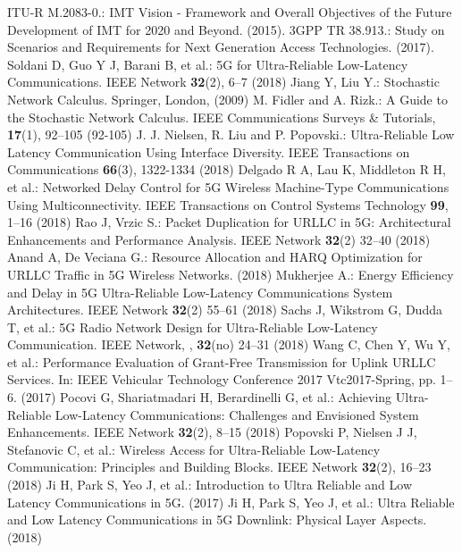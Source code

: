 \documentclass[runningheads]{llncs}
\begin{document}
\begin{thebibliography}{8}
ITU-R M.2083-0.: IMT Vision - Framework and Overall Objectives of the Future Development of IMT for 2020 and Beyond. (2015).
 3GPP TR 38.913.: Study on Scenarios and Requirements for Next Generation Access Technologies. (2017).
Soldani D, Guo Y J, Barani B, et al.: 5G for Ultra-Reliable Low-Latency Communications. IEEE Network \textbf{32}(2), 6--7 (2018)
Jiang Y, Liu Y.: Stochastic Network Calculus. Springer, London, (2009)
M. Fidler and A. Rizk.: A Guide to the Stochastic Network Calculus. IEEE Communications Surveys \& Tutorials, \textbf{17}(1), 92--105 (92-105)
J. J. Nielsen, R. Liu and P. Popovski.: Ultra-Reliable Low Latency Communication Using Interface Diversity. IEEE Transactions on Communications \textbf{66}(3), 1322-1334 (2018)
Delgado R A, Lau K, Middleton R H, et al.: Networked Delay Control for 5G Wireless Machine-Type Communications Using Multiconnectivity. IEEE Transactions on Control Systems Technology \textbf{99}, 1--16 (2018)
Rao J, Vrzic S.: Packet Duplication for URLLC in 5G: Architectural Enhancements and Performance Analysis. IEEE Network \textbf{32}(2) 32--40 (2018)
Anand A, De Veciana G.: Resource Allocation and HARQ Optimization for URLLC Traffic in 5G Wireless Networks. (2018)
Mukherjee A.: Energy Efficiency and Delay in 5G Ultra-Reliable Low-Latency Communications System Architectures. IEEE Network \textbf{32}(2) 55--61 (2018)
Sachs J, Wikstrom G, Dudda T, et al.: 5G Radio Network Design for Ultra-Reliable Low-Latency Communication. IEEE Network, , \textbf{32}(no) 24--31 (2018)
Wang C, Chen Y, Wu Y, et al.: Performance Evaluation of Grant-Free Transmission for Uplink URLLC Services. In: IEEE Vehicular Technology Conference 2017 Vtc2017-Spring,  pp. 1--6. (2017)
Pocovi G, Shariatmadari H, Berardinelli G, et al.: Achieving Ultra-Reliable Low-Latency Communications: Challenges and Envisioned System Enhancements. IEEE Network \textbf{32}(2), 8--15 (2018)
Popovski P, Nielsen J J, Stefanovic C, et al.: Wireless Access for Ultra-Reliable Low-Latency Communication: Principles and Building Blocks. IEEE Network \textbf{32}(2), 16--23 (2018)
Ji H, Park S, Yeo J, et al.: Introduction to Ultra Reliable and Low Latency Communications in 5G. (2017)
Ji H, Park S, Yeo J, et al.: Ultra Reliable and Low Latency Communications in 5G Downlink: Physical Layer Aspects. (2018)



\end{thebibliography}
\end{document}
